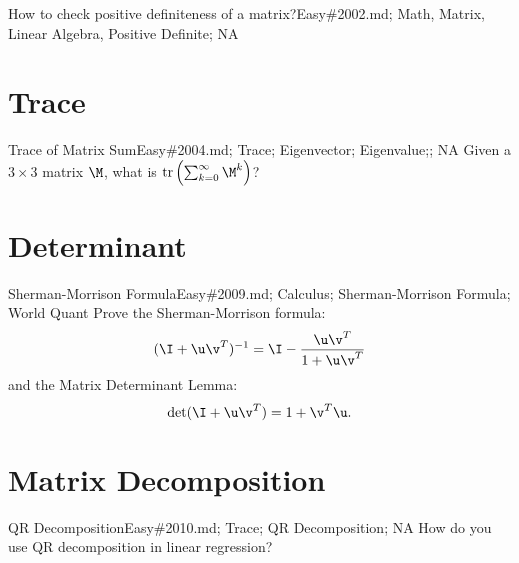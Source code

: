 \documentclass[oldfontcommands]{memoir}
\begin{document}
{\begin{question}{How to check positive definiteness of a matrix?}{Easy}{\#2002.md; Math, Matrix, Linear Algebra, Positive Definite; NA}
\end{question}

\section{Trace}
\begin{question}{Trace of Matrix Sum}{Easy}{\#2004.md; Trace; Eigenvector; Eigenvalue;; NA}
Given a $3 \times 3$ matrix $\M$, what is $\mbox{tr}\left(\sum_{k=0}^\infty \M^k\right)$?

\end{question}

\section{Determinant}
\begin{question}{Sherman-Morrison Formula}{Easy}{\#2009.md; Calculus; Sherman-Morrison Formula; World Quant}
Prove the Sherman-Morrison formula: $$(\I + \u\v^T)^{-1} = \I - \frac{\u\v^T}{1 + \u\v^T}$$ and the Matrix Determinant Lemma: $$\det(\I + \u\v^T) = 1+\v^T\u.$$	

\end{question}

\section{Matrix Decomposition}
\begin{question}{QR Decomposition}{Easy}{\#2010.md; Trace; QR Decomposition; NA}
How do you use QR decomposition in linear regression?

\end{question}

}
\end{document}

